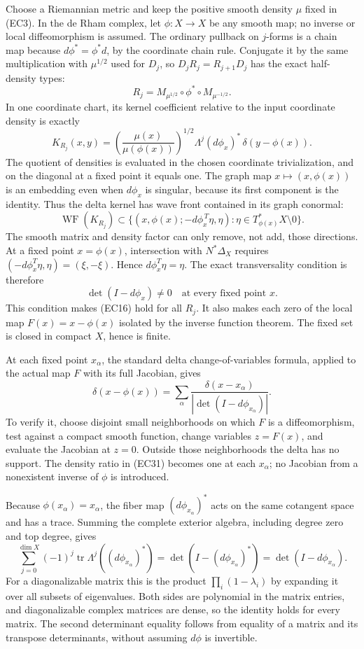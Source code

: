 \documentclass[
  11pt,
]{article}
\begin{document}
Choose a Riemannian metric and keep the positive smooth density \(\mu\)
fixed in (EC3). In the de Rham complex, let \(\phi:X\to X\) be any
smooth map; no inverse or local diffeomorphism is assumed. The ordinary
pullback on \(j\)-forms is a chain map because \(d\phi^*=\phi^*d\), by
the coordinate chain rule. Conjugate it by the same multiplication with
\(\mu^{1/2}\) used for \(D_j\), so \(D_jR_j=R_{j+1}D_j\) has the exact
half-density types: \[
 R_j=M_{\mu^{1/2}}\circ\phi^*
                    \circ M_{\mu^{-1/2}}.
 \tag{EC30}
\] In one coordinate chart, its kernel coefficient relative to the input
coordinate density is exactly \[
 K_{R_j}(x,y)
 =\left(\frac{\mu(x)}{\mu(\phi(x))}\right)^{1/2}
   \Lambda^j(d\phi_x)^*\,\delta(y-\phi(x)).
 \tag{EC31}
\] The quotient of densities is evaluated in the chosen coordinate
trivialization, and on the diagonal at a fixed point it equals one. The
graph map \(x\mapsto(x,\phi(x))\) is an embedding even when \(d\phi_x\)
is singular, because its first component is the identity. Thus the delta
kernel has wave front contained in its graph conormal: \[
 \operatorname{WF}(K_{R_j})\subset
 \{(x,\phi(x);-d\phi_x^{\,T}\eta,\eta):
                      \eta\in T^*_{\phi(x)}X\setminus0\}.
 \tag{EC32}
\] The smooth matrix and density factor can only remove, not add, those
directions. At a fixed point \(x=\phi(x)\), intersection with
\(N^*\Delta_X\) requires \((-d\phi_x^T\eta,\eta)=(\xi,-\xi)\). Hence
\(d\phi_x^T\eta=\eta\). The exact transversality condition is therefore
\[
 \det(I-d\phi_x)\ne0
 \quad\text{at every fixed point }x.
 \tag{EC33}
\] This condition makes (EC16) hold for all \(R_j\). It also makes each
zero of the local map \(F(x)=x-\phi(x)\) isolated by the inverse
function theorem. The fixed set is closed in compact \(X\), hence is
finite.

At each fixed point \(x_\alpha\), the standard delta change-of-variables
formula, applied to the actual map \(F\) with its full Jacobian, gives
\[
 \delta(x-\phi(x))
   =\sum_\alpha
       \frac{\delta(x-x_\alpha)}
            {|\det(I-d\phi_{x_\alpha})|}.
 \tag{EC34}
\] To verify it, choose disjoint small neighborhoods on which \(F\) is a
diffeomorphism, test against a compact smooth function, change variables
\(z=F(x)\), and evaluate the Jacobian at \(z=0\). Outside those
neighborhoods the delta has no support. The density ratio in (EC31)
becomes one at each \(x_\alpha\); no Jacobian from a nonexistent inverse
of \(\phi\) is introduced.

Because \(\phi(x_\alpha)=x_\alpha\), the fiber map
\((d\phi_{x_\alpha})^*\) acts on the same cotangent space and has a
trace. Summing the complete exterior algebra, including degree zero and
top degree, gives \[
 \sum_{j=0}^{\dim X}(-1)^j
     \operatorname{tr}\Lambda^j((d\phi_{x_\alpha})^*)
 =\det(I-(d\phi_{x_\alpha})^*)
 =\det(I-d\phi_{x_\alpha}).
 \tag{EC35}
\] For a diagonalizable matrix this is the product
\(\prod_i(1-\lambda_i)\) by expanding it over all subsets of
eigenvalues. Both sides are polynomial in the matrix entries, and
diagonalizable complex matrices are dense, so the identity holds for
every matrix. The second determinant equality follows from equality of a
matrix and its transpose determinants, without assuming \(d\phi\) is
invertible.
\end{document}
